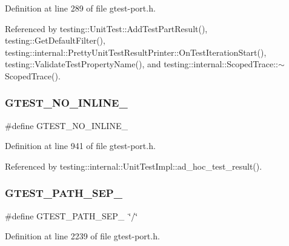 Definition at line 289 of file gtest-\/port.\+h.



Referenced by testing\+::\+Unit\+Test\+::\+Add\+Test\+Part\+Result(), testing\+::\+Get\+Default\+Filter(), testing\+::internal\+::\+Pretty\+Unit\+Test\+Result\+Printer\+::\+On\+Test\+Iteration\+Start(), testing\+::\+Validate\+Test\+Property\+Name(), and testing\+::internal\+::\+Scoped\+Trace\+::$\sim$\+Scoped\+Trace().

\mbox{\label{gtest-port_8h_a9945cbd967fbccb15f8de711f58955c7}} 
\subsubsection{\texorpdfstring{G\+T\+E\+S\+T\+\_\+\+N\+O\+\_\+\+I\+N\+L\+I\+N\+E\+\_\+}{GTEST\_NO\_INLINE\_}}
{\footnotesize\ttfamily \#define G\+T\+E\+S\+T\+\_\+\+N\+O\+\_\+\+I\+N\+L\+I\+N\+E\+\_\+}



Definition at line 941 of file gtest-\/port.\+h.



Referenced by testing\+::internal\+::\+Unit\+Test\+Impl\+::ad\+\_\+hoc\+\_\+test\+\_\+result().

\mbox{\label{gtest-port_8h_afbb636e91bdd50267dbef11a50490b29}} 
\subsubsection{\texorpdfstring{G\+T\+E\+S\+T\+\_\+\+P\+A\+T\+H\+\_\+\+S\+E\+P\+\_\+}{GTEST\_PATH\_SEP\_}}
{\footnotesize\ttfamily \#define G\+T\+E\+S\+T\+\_\+\+P\+A\+T\+H\+\_\+\+S\+E\+P\+\_\+~\char`\"{}/\char`\"{}}



Definition at line 2239 of file gtest-\/port.\+h.

